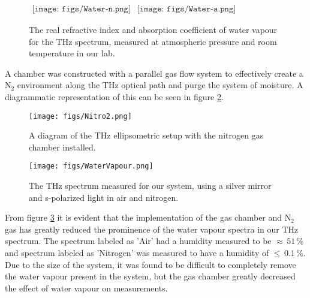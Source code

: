 \begin{figure}[H]
                \begin{center}$
								\begin{array}{cc}
                \texttt{[image: figs/Water-n.png]}&
                \texttt{[image: figs/Water-a.png]}
								\end{array}$
								\end{center}
	\caption[THz water vapour real refractive index and absorption spectrum]{The real refractive index and absorption coefficient of water vapour for the THz spectrum, measured at atmospheric pressure and room temperature in our lab.}
	\label{fig:WatRef}
\end{figure}


A chamber was constructed with a parallel gas flow system to effectively create a $\text{N}_{2}$ environment along the THz optical path and purge the system of moisture. A diagrammatic representation of this can be seen in figure \ref{fig:NitDia}.

\begin{figure}[H]
\begin{center}
	 \texttt{[image: figs/Nitro2.png]}
	 \caption[Nitrogen gas chamber diagram]{A diagram of the THz ellipsometric setup with the nitrogen gas chamber installed.}
   \label{fig:NitDia}
\end{center}
\end{figure}

\begin{figure}[H]
\begin{center}
	 \texttt{[image: figs/WaterVapour.png]}
	 \caption[Measured THz spectrum with and without Nitrogen]{The THz spectrum measured for our system, using a silver mirror and s-polarized light in air and nitrogen.}
   \label{fig:WatRefspec}
\end{center}
\end{figure}

From figure \ref{fig:WatRefspec} it is evident that the implementation of the gas chamber and $\text{N}_{2}$ gas has greatly reduced the prominence of the water vapour spectra in our THz spectrum. The spectrum labeled as 'Air' had a humidity measured to be $\approx\,51\,\%$ and spectrum labeled as 'Nitrogen' was measured to have a humidity of $\leq\,0.1\,\%$. Due to the size of the system, it was found to be difficult to completely remove the water vapour present in the system, but the gas chamber greatly decreased the effect of water vapour on measurements.
\endinput